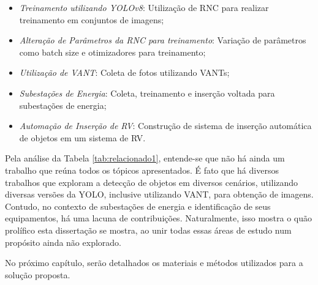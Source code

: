 \begin{itemize}
    \item \textit{Treinamento utilizando YOLOv8}: Utilização de RNC para realizar treinamento em conjuntos de imagens;
    \item \textit{Alteração de Parâmetros da RNC para treinamento}: Variação de parâmetros como batch size e otimizadores para treinamento;
    \item \textit{Utilização de VANT}: Coleta de fotos utilizando VANTs;
    \item \textit{Subestações de Energia}: Coleta, treinamento e inserção voltada para subestações de energia;
    \item \textit{Automação de Inserção de RV}: Construção de sistema de inserção automática de objetos em um sistema de RV.
\end{itemize}

Pela análise da Tabela \ref{tab:relacionado1}, entende-se que não há ainda um trabalho que reúna todos os tópicos apresentados. É fato que há diversos trabalhos que exploram a detecção de objetos em diversos cenários, utilizando diversas versões da YOLO, inclusive utilizando VANT, para obtenção de imagens. Contudo, no contexto de subestações de energia e identificação de seus equipamentos, há uma lacuna de contribuições. Naturalmente, isso mostra o quão prolífico esta dissertação se mostra, ao unir todas essas áreas de estudo num propósito ainda não explorado.

No próximo capítulo, serão detalhados os materiais e métodos utilizados para a solução proposta.










